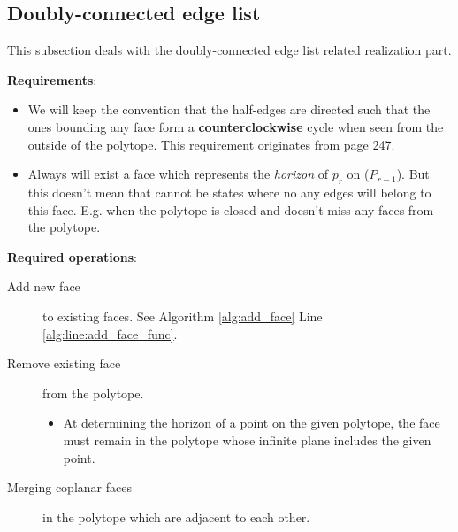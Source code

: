 

\subsection{Doubly-connected edge list}

This subsection deals with the doubly-connected edge list related realization
part.

\textbf{Requirements}:

\begin{itemize}

\item	We will keep the convention that the half-edges are directed such that
			the ones bounding any face form a \textbf{counterclockwise} cycle
			when seen from the outside of the polytope. This requirement
			originates from \citeauthor{compgeo08} page 247.

\item	Always will exist a face which represents the \textit{horizon} of $p_r$
			on \convhull($P_{r-1}$). But this doesn't mean that cannot be states
			where no any edges will belong to this face. E.g. when the polytope
			is closed and doesn't miss any faces from the polytope.

\end{itemize}


\textbf{Required operations}:

\begin{description}

	\item	[Add new face] to existing faces. See Algorithm \ref{alg:add_face}
		Line \ref{alg:line:add_face_func}.
	
	
	\item	[Remove existing face] from the polytope.
		\begin{itemize}
			\item	At determining the horizon of a point on the given polytope,
				the face must remain in the polytope whose infinite plane
				includes the given point.
		\end{itemize}
		
	\item	[Merging coplanar faces] in the polytope which are adjacent to each
				other.

\end{description}


\newcommand{\vara}		{$\mathcal{V}_a$}
\newcommand{\lste}		{$\mathcal{L}_e$}

